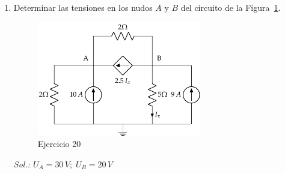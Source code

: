 \begin{enumerate}
\item Determinar las tensiones en los nudos $A$ y $B$ del circuito de la Figura~\ref{fig.ej14_BT1}.
\begin{figure}[H]
    \centering
    \includegraphics[height=5cm]{../figs/ej14_BT1.pdf}
    \caption{Ejercicio 20}
    \label{fig.ej14_BT1}
\end{figure}
\emph{Sol.: $U_A=30\,V;\;U_B=20\,V$}

\end{enumerate}